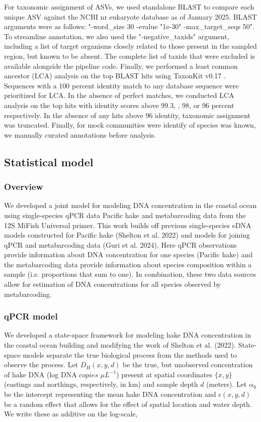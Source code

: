 \documentclass{article}
\begin{document}
For taxonomic assignment of ASVs, we used standalone BLAST \cite{altschul1990} to compare each unique ASV against the NCBI nr eukaryote database as of January 2025. BLAST arguments were as follows: "-word\_size 30 -evalue "1e-30" -max\_target\_seqs 50". To streamline annotation, we also used the "-negative\_taxids" argument, including a list of target organisms closely related to those present in the sampled region, but known to be absent. The complete list of taxids that were excluded is available alongside the pipeline code. Finally, we performed a least common ancestor (LCA) analysis on the top BLAST hits using TaxonKit v0.17 \cite{shen2021}. Sequences with a 100 percent identity match to any database sequence were prioritized for LCA. In the absence of perfect matches, we conducted LCA analysis on the top hits with identity scores above 99.3, , 98, or 96 percent respectively. In the absence of any hits above 96 identity, taxonomic assignment was truncated. Finally, for mock communities were identify of species was known, we manually curated annotations before analysis. 

\subsection*{Statistical model}

\subsubsection*{Overview}

We developed a joint model for modeling DNA concentration in the coastal ocean using single-species qPCR data Pacific hake and metabarcoding data from the 12S MiFish Universal primer. This work builds off previous single-species eDNA models constructed for Pacific hake (Shelton et al. 2022) and models for joining qPCR and metabarcoding data (Guri et al. 2024). Here qPCR observations provide information about DNA concentration for one species (Pacific hake) and the metabarcoding data provide information about species composition within a sample (i.e. proportions that sum to one).  In combination, these two data sources allow for estimation of DNA concentrations for all species observed by metabarcoding.

\subsubsection*{qPCR model}

We developed a state-space framework for modeling hake DNA concentration in the coastal ocean building and modifying the work of Shelton et al. (2022).  State-space models separate the true biological process from the methods used to observe the process. Let $D_H(x,y,d)$ be the true, but unobserved concentration of hake DNA (log DNA $copies$ $\mu L^{-1}$) present at spatial coordinates $\{x,y\}$ (eastings and northings, respectively, in km) and sample depth $d$ (meters). Let $\alpha_0$ be the intercept representing the mean hake DNA concentration and $\epsilon(x,y,d)$ be a random effect that allows for the effect of spatial location and water depth. We write these as additive on the log-scale,
\end{document}
